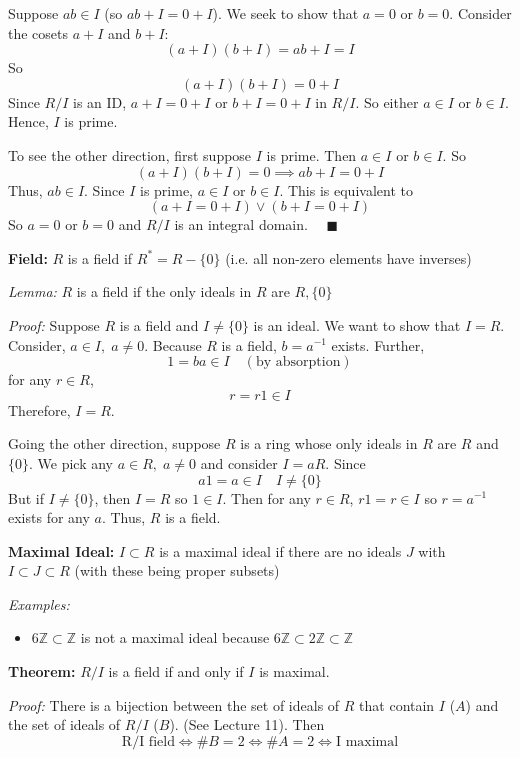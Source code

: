 \documentclass[12pt]{report}
\newcommand{\qed}{\quad \blacksquare}
\newcommand{\Z}{\mathbb{Z}}
\begin{document}
Suppose $ab \in I$ (so $ab + I = 0 + I$). We seek to show that $a = 0$ or $b = 0$. Consider the cosets $a + I$ and $b + I$:
\[(a + I)(b + I) = ab + I = I\]
So 
\[(a + I)(b + I) = 0 + I\]
Since $R/I$ is an ID, $a + I = 0 + I$ or $b + I = 0 + I$ in $R/I$. So either $a \in I$ or $b \in I$. Hence, $I$ is prime. 

To see the other direction, first suppose $I$ is prime. Then $a \in I$ or $b \in I$. So 
\[(a + I)(b + I) = 0 \implies ab + I = 0 + I\]
Thus, $ab \in I$. Since $I$ is prime, $a \in I$ or $b \in I$. This is equivalent to 
\[(a + I = 0 + I) \lor (b + I = 0 + I)\] 
So $a = 0$ or $b = 0$ and $R/I$ is an integral domain. $\qed$

\vspace*{0.25in}

\textbf{Field:} $R$ is a field if $R^* = R - \{0\}$ (i.e. all non-zero elements have inverses)

\emph{Lemma:} $R$ is a field if the only ideals in $R$ are $R, \{0\}$

\emph{Proof:} Suppose $R$ is a field and $I \neq \{0\}$ is an ideal. We want to show that $I = R$. Consider, $a \in I, \; a \neq 0$. Because $R$ is a field, $b = a^{-1}$ exists. Further, 
\[1 = ba \in I \quad (\text{by absorption})\]
for any $r \in R$,
\[r = r1 \in I\]
Therefore, $I = R$. 

Going the other direction, suppose $R$ is a ring whose only ideals in $R$ are $R$ and $\{0\}$. We pick any $a \in R, \; a \neq 0$ and consider $I = aR$. Since
\[a1 = a \in I \quad I \neq \{0\}\]
But if $I \neq \{0\}$, then $I = R$ so $1 \in I$. Then for any $r\in R$, $r1 = r \in I$ so $r = a^{-1}$ exists for any $a$. Thus, $R$ is a field.


\textbf{Maximal Ideal:} $I \subset R$ is a maximal ideal if there are no ideals $J$ with $I \subset J \subset R$ (with these being proper subsets) 

\emph{Examples:} 
\begin{itemize}
    \item $6\Z \subset \Z$ is not a maximal ideal because $6\Z \subset 2\Z \subset \Z$
\end{itemize}


\textbf{Theorem:} $R/I$ is a field if and only if $I$ is maximal.

\emph{Proof:} There is a bijection between the set of ideals of $R$ that contain $I$ ($A$) and the set of ideals of $R/I$ ($B$). (See Lecture 11). Then
\[\text{R/I field} \iff \#B = 2 \iff \#A = 2 \iff \text{I maximal}\]
\end{document}
